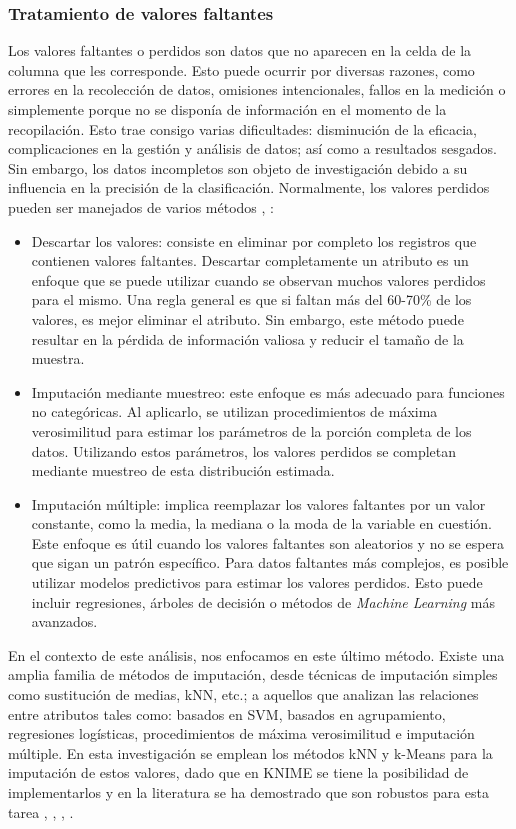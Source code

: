 \subsubsection*{Tratamiento de valores faltantes} \label{secc:mv}
Los valores faltantes o perdidos son datos que no aparecen en la celda de la columna que les corresponde. Esto puede ocurrir por diversas razones, como errores en la recolección de datos, omisiones intencionales, fallos en la medición o simplemente porque no se disponía de información en el momento de la recopilación. Esto trae consigo varias dificultades: disminución de la eficacia, complicaciones en la gestión y análisis de datos; así como a resultados sesgados. Sin embargo, los datos incompletos son objeto de investigación debido a su influencia en la precisión de la clasificación. Normalmente, los valores perdidos pueden ser manejados de varios métodos \citep{garcia2015data}, \citep{ventevogel2020construction}:
\begin{itemize}
	\item Descartar los valores: consiste en eliminar por completo los registros que contienen valores faltantes. Descartar completamente un atributo es un enfoque que se puede utilizar cuando se observan muchos valores perdidos para el mismo. Una regla general es que si faltan más del 60-70\% de los valores, es mejor eliminar el atributo. Sin embargo, este método puede resultar en la pérdida de información valiosa y reducir el tamaño de la muestra.
	\item Imputación mediante muestreo: este enfoque es más adecuado para funciones no categóricas. Al aplicarlo, se utilizan procedimientos de máxima verosimilitud para estimar los parámetros de la porción completa de los datos. Utilizando estos parámetros, los valores perdidos se completan mediante muestreo de esta distribución estimada.
	\item Imputación múltiple: implica reemplazar los valores faltantes por un valor constante, como la media, la mediana o la moda de la variable en cuestión. Este enfoque es útil cuando los valores faltantes son aleatorios y no se espera que sigan un patrón específico. Para datos faltantes más complejos, es posible utilizar modelos predictivos para estimar los valores perdidos. Esto puede incluir regresiones, árboles de decisión o métodos de \textit{Machine Learning} más avanzados.
\end{itemize}
En el contexto de este análisis, nos enfocamos en este último método. Existe una amplia familia de métodos de imputación, desde técnicas de imputación simples como sustitución de medias, kNN, etc.; a aquellos que analizan las relaciones entre atributos tales como: basados en SVM, basados en agrupamiento, regresiones logísticas, procedimientos de máxima verosimilitud e imputación múltiple. En esta investigación se emplean los métodos kNN y k-Means para la imputación de estos valores, dado que en KNIME se tiene la posibilidad de implementarlos y en la literatura se ha demostrado que son robustos para esta tarea \citep{tsai2022empirical}, \citep{batista2003analysis}, \citep{patil2010missing}, \citep{li2004towards}.\\
